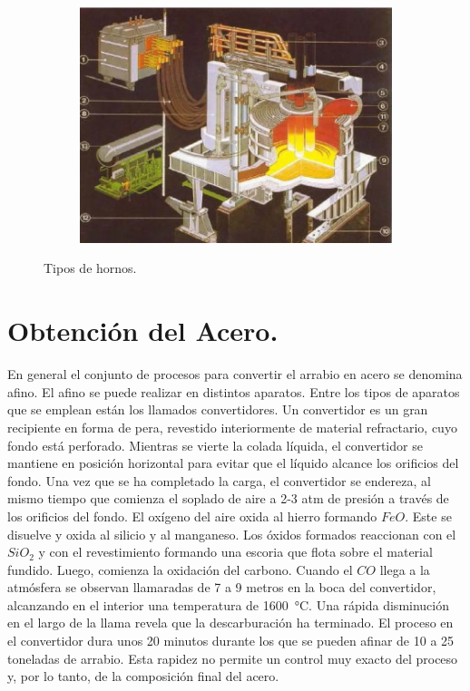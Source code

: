 \documentclass[12pt,a4paper]{article}
\begin{document}
\begin{figure}[h!]
\begin{subfigure}{0.45\textwidth}
        \label{crisol}
    \end{subfigure}
    \hfill
    \begin{subfigure}{0.45\textwidth}
        \centering
        \includegraphics[width=\textwidth]{Inagenes para latex/arco electrico.png}
        \label{electrico}
    \end{subfigure}
    \caption{Tipos de hornos.}
    \label{fig:hornos}
\end{figure}

\section{Obtención del Acero.}

En general el conjunto de procesos para convertir el arrabio en acero se denomina afino. El afino se puede realizar en distintos aparatos. Entre los tipos de aparatos que se emplean están los llamados convertidores.
Un convertidor es un gran recipiente en forma de pera, revestido interiormente de material refractario, cuyo fondo está perforado. Mientras se vierte la colada líquida, el convertidor se mantiene en posición horizontal para evitar que el líquido alcance los orificios del fondo. Una vez que se ha completado la carga, el convertidor se endereza, al mismo tiempo que comienza el soplado de aire a 2-3 atm de presión a través de los orificios del fondo. El oxígeno del aire oxida al hierro formando $FeO$. Este se disuelve y oxida al silicio y al manganeso. Los óxidos formados reaccionan con el $SiO_2$ y con el revestimiento formando una escoria que flota sobre el material fundido. Luego, comienza la oxidación del carbono. Cuando el $CO$ llega a la atmósfera se observan llamaradas de 7 a 9 metros en la boca del convertidor, alcanzando en el interior una temperatura de \SI{1600}{\celsius}. Una rápida disminución en el largo de la llama revela que la descarburación ha terminado. El proceso en el convertidor dura unos 20 minutos durante los que se pueden afinar de 10 a 25 toneladas de arrabio. Esta rapidez no permite un control muy exacto del proceso y, por lo tanto, de la composición final del acero.
\end{document}
